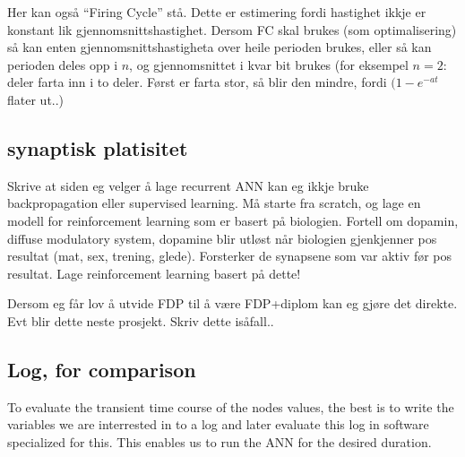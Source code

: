 Her kan også ``Firing Cycle'' stå. Dette er estimering fordi hastighet ikkje er konstant lik gjennomsnittshastighet. Dersom FC skal brukes (som optimalisering) så kan enten gjennomsnittshastigheta over heile perioden brukes, eller så kan perioden deles opp i $n$, og gjennomsnittet i kvar bit brukes (for eksempel $n=2$: deler farta inn i to deler. Først er farta stor, så blir den mindre, fordi $(1-e^{-at}$ flater ut..)




	\subsection{synaptisk platisitet}
	Skrive at siden eg velger å lage recurrent ANN kan eg ikkje bruke backpropagation eller supervised learning. Må starte fra scratch, og lage en modell for reinforcement learning som er basert på biologien. 
	Fortell om dopamin, diffuse modulatory system, dopamine blir utløst når biologien gjenkjenner pos resultat (mat, sex, trening, glede). Forsterker de synapsene som var aktiv før pos resultat. 
	Lage reinforcement learning basert på dette!

	Dersom eg får lov å utvide FDP til å være FDP+diplom kan eg gjøre det direkte. Evt blir dette neste prosjekt. Skriv dette isåfall..




\subsection{Log, for comparison}
To evaluate the transient time course of the nodes values, the best is to write the variables we are interrested in to a log and later evaluate this log in software specialized for this.
This enables us to run the ANN for the desired duration. 

